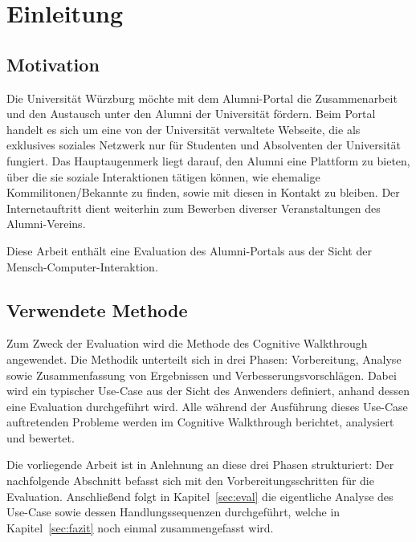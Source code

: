 \section{Einleitung}
\subsection{Motivation}
Die Universität Würzburg möchte mit dem Alumni-Portal die Zusammenarbeit und den Austausch unter den Alumni der Universität fördern. 
Beim Portal handelt es sich um eine von der Universität verwaltete Webseite, die als exklusives soziales Netzwerk nur für Studenten und Absolventen der Universität fungiert. 
Das Hauptaugenmerk liegt darauf, den Alumni eine Plattform zu bieten, über die sie soziale Interaktionen tätigen können, wie ehemalige Kommilitonen/Bekannte zu finden, sowie mit diesen in Kontakt zu bleiben. Der Internetauftritt dient weiterhin zum Bewerben diverser Veranstaltungen des Alumni-Vereins.  

Diese Arbeit enthält eine Evaluation des Alumni-Portals aus der Sicht der Mensch-Computer-Interaktion. 

\subsection{Verwendete Methode}
Zum Zweck der Evaluation wird die Methode des Cognitive Walkthrough angewendet.
Die Methodik unterteilt sich in drei Phasen: Vorbereitung, Analyse sowie Zusammenfassung von Ergebnissen und Verbesserungsvorschlägen. 
Dabei wird ein typischer Use-Case aus der Sicht des Anwenders definiert, anhand dessen eine Evaluation durchgeführt wird. Alle während der Ausführung dieses Use-Case auftretenden Probleme werden im Cognitive Walkthrough berichtet, analysiert und bewertet.

Die vorliegende Arbeit ist in Anlehnung an diese drei Phasen strukturiert: Der nachfolgende Abschnitt befasst sich mit den Vorbereitungsschritten für die Evaluation. Anschließend folgt in Kapitel~\ref{sec:eval} die eigentliche Analyse des Use-Case sowie dessen Handlungssequenzen durchgeführt, welche in Kapitel~\ref{sec:fazit} noch einmal zusammengefasst wird.